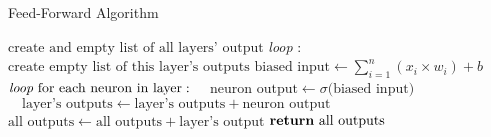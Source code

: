 \def\BState{\State\hskip-\ALG@thistlm}
\begin{algorithm}
\caption{Feed-Forward Algorithm}\label{euclid}
\begin{algorithmic}[1]
\State $\text{create and empty list of all layers' output}$ %
\State \emph{loop} : %
\State \enspace\enspace$\text{create empty list of this layer's outputs}$
\State \enspace\enspace$\text{biased input}\gets\sum\limits_{i=1}^n (x_i\times w_i)+b$
\State \enspace\enspace$\emph{loop} \text{ for each neuron in layer}:$
\State \enspace\enspace$\enspace\enspace \text{neuron output}\gets\sigma\text{(biased input)}$
\State \enspace\enspace$\enspace\enspace \text{layer's outputs}\gets\text{layer's outputs}+\text{neuron output}$
\State \enspace\enspace$\text{all outputs}\gets\text{all outputs}+\text{layer's output}$
\State $\Return \text{ all outputs}$ %
\EndProcedure
\end{algorithmic}
\end{algorithm}